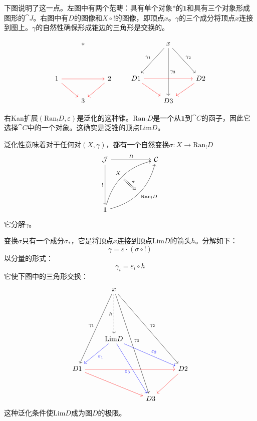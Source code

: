 \documentclass[DaoFP]{subfiles}
\begin{document}
下图说明了这一点。左图中有两个范畴：具有单个对象$*$的$\mathbf 1$和具有三个对象形成图形的$\cat J$。右图中有$D$的图像和$X \circ !$的图像，即顶点$x$。$\gamma$的三个成分将顶点$x$连接到图上。$\gamma$的自然性确保形成锥边的三角形是交换的。

\[
\begin{tikzcd}
& *
\\
\\
1
\arrow[rr, red]
\arrow[rd, red]
&& 2
\arrow[dl, red]
\\
& 3
\end{tikzcd}
\qquad
\begin{tikzcd}
& x
\arrow[ddr, "\gamma_2"]
\arrow[ddl, "\gamma_1"']
\arrow[ddd, "\gamma_3"]
\\
\\
D 1
\arrow[rr, red]
\arrow[rd, red]
&& D 2
\arrow[dl, red]
\\
& D 3
\end{tikzcd}
\]

右Kan扩展$(\text{Ran}_! D, \varepsilon)$是泛化的这种锥。$\text{Ran}_! D$是一个从$\mathbf 1$到$\cat C$的函子，因此它选择$\cat C$中的一个对象。这确实是泛锥的顶点$\text{Lim} D$。

泛化性意味着对于任何对$(X, \gamma)$，都有一个自然变换$\sigma \colon X \to \text{Ran}_! D$
\[
\begin{tikzcd}[row sep=2cm, column sep=2cm]
\cat J  \ar[d, "!"', "" {name=P}]
\ar[r, "D", ""  {name=F, below, near start, bend right}]
&
\cat C
\\
\mathbf 1
\ar[ur, bend left, "X", "" {name=G, below}]
\ar[ur, bend right, "\text{Ran}_! D"', "" {name=Ran}]
\arrow[Rightarrow, "\sigma", from=G, to=Ran]
\end{tikzcd}
\]
它分解$\gamma$。

变换$\sigma$只有一个成分$\sigma_*$，它是将顶点$x$连接到顶点$\text{Lim} D$的箭头$h$。分解如下：
\[ \gamma = \varepsilon \cdot (\sigma \circ !) \]
以分量的形式：
\[ \gamma_i = \varepsilon_i \circ h \]
它使下图中的三角形交换：
\[
\begin{tikzcd}[row sep=1cm]
& x
\arrow[dddl, "\gamma_1"']
\arrow[ddddr, "\gamma_3"]
\arrow[dddrr, "\gamma_2"]
\arrow[dd, dashed, "h"']
\\
\\
& \text{Lim} D
\arrow[dl, blue, "\varepsilon_1"]
\arrow[ddr, blue, "\varepsilon_3"']
\arrow[drr, blue, "\varepsilon_2"]
\\
D 1
\arrow[rrr, red]
\arrow[rrd, red]
&&& D 2
\arrow[dl, red]
\\
&& D 3
\end{tikzcd}
\]
这种泛化条件使$\text{Lim} D$成为图$D$的极限。
\end{document}
